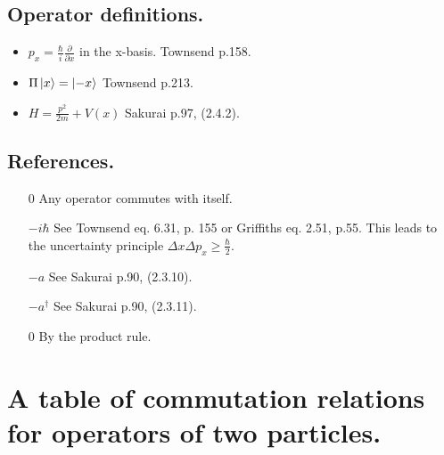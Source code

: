 \documentclass[12pt,letterpaper]{article}
\begin{document}



\subsection{Operator definitions.}
\begin{itemize}
\item \label{def_p_x} $p_x = \frac{\hbar}{i}\frac{\partial}{\partial x}$ in the x-basis. Townsend p.158.
\item \label{def_Pi} $\Pi\ket{x}=\ket{-x}$ Townsend p.213.
\item \label{def_H} $H = \frac{p^2}{2m} + V(x)$ Sakurai p.97, (2.4.2). 
\end{itemize}

\subsection{References.}
\begin{itemize}
\item[0] \label{self} Any operator commutes with itself.
\item[$-i \hbar$] \label{unc} See Townsend eq. 6.31, p. 155 or Griffiths eq. 2.51, p.55. This leads to the uncertainty principle $\Delta x \Delta p_x \geq \frac{\hbar}{2}$.
\item[$-a$] \label{N-a} See Sakurai p.90, (2.3.10).
\item[$-a^\dagger$] \label{N-aDag} See Sakurai p.90, (2.3.11).
\item[0] \label{H-p_x} By the product rule.
\end{itemize}

\section{A table of commutation relations for operators of two particles.}
\end{document}
